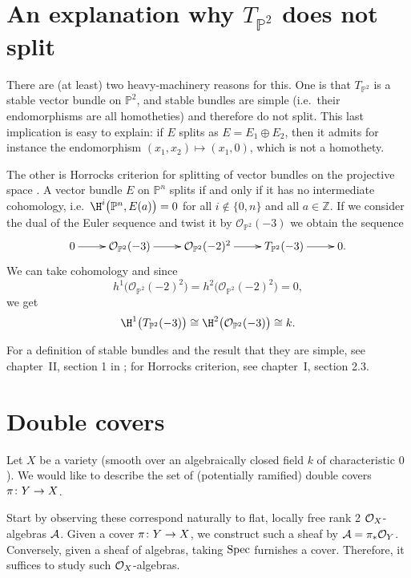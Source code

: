 \section{An explanation why $T_{\mathbb{P}^2}$ does not split}

There are (at least) two heavy\--machinery reasons for this. One is that $T_{\mathbb{P}^2}$ is a stable vector bundle on $\mathbb{P}^2$, and stable bundles are simple (i.e.\ their endomorphisms are all homotheties) and therefore do not split. This last implication is easy to explain: if $E$ splits as ${E=E_1\oplus E_2}$, then it admits for instance the endomorphism ${(x_1,x_2)\mapsto(x_1,0)}$, which is not a homothety.

The other is Horrocks criterion for splitting of vector bundles on the projective space \cite{Horrocks-Punctured-spectrum}. A vector bundle $E$ on $\mathbb{P}^n$ splits if and only if it has no intermediate cohomology, i.e.\ ${\H^i\big(\mathbb{P}^n,E(a)\big)=0}$ for all ${i\notin\{0,n\}}$ and all ${a\in\mathbb{Z}}$. If we consider the dual of the Euler sequence and twist it by ${\mathcal{O}_{\mathbb{P}^2}(-3)}$ we obtain the sequence
\[\xymatrix{0\ar[r] &\mathcal{O}_{\mathbb{P}^2}(-3)\ar[r] 
  &\mathcal{O}_{\mathbb{P}^2}(-2)^2\ar[r]
  &T_{\mathbb{P}^2}(-3)\ar[r] &0.}\]
We can take cohomology and since
\[
{h^1\big(\mathcal{O}_{\mathbb{P}^2}(-2)^2\big)=h^2\big(\mathcal{O}_{\mathbb{P}^2}(-2)^2\big)=0},
\]
we get
\[
{\H^1\big(T_{\mathbb{P}^2}(-3)\big)\cong \H^2\big(\mathcal{O}_{\mathbb{P}^2}(-3)\big)\cong k}.
\]

For a definition of stable bundles and the result that they are simple, see chapter~II, section 1 in \cite{OSS-Vector-bundles}; for Horrocks criterion, see chapter~I, section 2.3.  


\section{Double covers}

Let $X$ be a variety (smooth over an algebraically closed field $k$ of characteristic $0$). We would like to describe the set of (potentially ramified) double covers $\pi \cn Y \rarr X$.

Start by observing these correspond naturally to flat, locally free rank 2 $\mathcal{O}_X$-algebras $\mathcal{A}$. Given a cover $\pi \cn Y \rarr X$, we construct such a sheaf by $\mathcal{A} = \pi_\ast \mathcal{O}_Y$. Conversely, given a sheaf of algebras, taking $\operatorname{Spec}$ furnishes a cover. Therefore, it suffices to study such $\mathcal{O}_X$-algebras.

